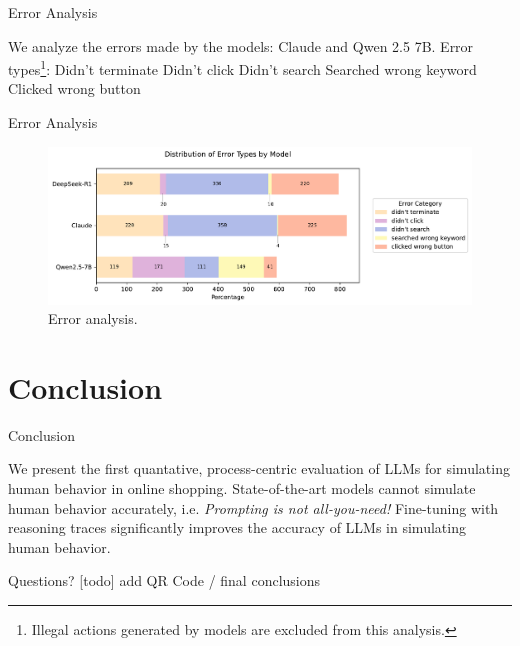 \documentclass[scheme=plain]{beamer}
\begin{document}
\begin{frame}{Error Analysis}
  \begin{outline}
    \1 We analyze the errors made by the models: Claude and Qwen 2.5 7B.
    \1 Error types\footnote{Illegal actions generated by models are excluded from this analysis.}:
      \2 Didn't terminate
      \2 Didn't click
      \2 Didn't search
      \2 Searched wrong keyword
      \2 Clicked wrong button
  \end{outline}
\end{frame}

\begin{frame}{Error Analysis}
  \begin{figure}
    \includegraphics[width=\linewidth]{figures/error_analysis.pdf}
    \caption{Error analysis.}
  \end{figure}
\end{frame}

\section{Conclusion}

\begin{frame}{Conclusion}
  \begin{outline}
    \1 We present the first quantative, process-centric evaluation of LLMs for simulating human behavior in online shopping.
    \1 State-of-the-art models cannot simulate human behavior accurately, i.e. \textit{Prompting is not all-you-need!}
    \1 Fine-tuning with reasoning traces significantly improves the accuracy of LLMs in simulating human behavior.
  \end{outline}
\end{frame}

\begin{frame}[standout]
  Questions?
  [todo] add QR Code / final conclusions
\end{frame}
\end{document}
